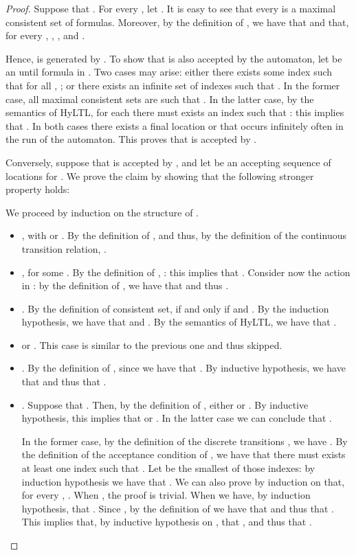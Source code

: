 \documentclass[submission,copyright,creativecommons]{eptcs}
\newcommand{\hyltl}{\textsf{HyLTL}\xspace}
\begin{document}
\begin{proof}
Suppose that . For every , let . It is easy to see that every  is a maximal consistent set of formulas. Moreover, by the definition of , we have that  and that, for every , ,
, and .

Hence,  is generated by . To show that  is also accepted by the automaton, let  be an until formula in . Two cases may arise: either there exists some index  such that for all , ; or there exists an infinite set of indexes  such that . In the former case, all maximal consistent sets  are such that . In the latter case, by the semantics of \hyltl, for each  there must exists an index  such that : this implies that . In both cases there exists a final location  or  that occurs infinitely often in the run of the automaton. This proves that  is accepted by .

\medskip

Conversely, suppose that  is accepted by , and let  be an accepting sequence of locations for . We prove the claim by showing that the following stronger property holds:

 
\noindent We proceed by induction on the structure of .

\begin{itemize}
	\item , with  or . By the definition of ,  and thus, by the definition of the continuous transition relation, .
	
	\item , for some . By the definition of , : this implies that . Consider now the action  in : by the definition of , we have that  and thus .
	
	\item . By the definition of consistent set,  if and only if  and . By the induction hypothesis, we have that  and . By the semantics of \hyltl, we have that .
	
	\item  or . This case is similar to the previous one and thus skipped.
	
	\item . By the definition of , since  we have that . By inductive hypothesis, we have that  and thus that .



	\item . Suppose that . Then, by the definition of , either  or . By inductive hypothesis, this implies that  or . In the latter case we can conclude that .
	
	In the former case, by the definition of the discrete transitions , we have . By the definition of the acceptance condition of , we have that there must exists at least one index  such that . Let  be the smallest of those indexes: by induction hypothesis we have that . We can also prove by induction on  that, for every , . When , the proof is trivial. When  we have, by induction hypothesis, that . Since , by the definition of  we have that  and thus that . This implies that, by inductive hypothesis on , that , and thus that .


\end{itemize}
\end{proof}
\end{document}
